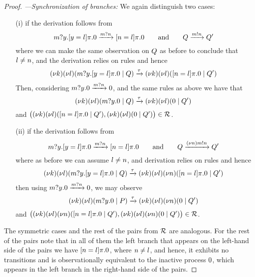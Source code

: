 \begin{proof}
\;\emph{---Synchronization of branches:}\;
We again distinguish two cases:
\begin{itemize}
\item [(i)] if the derivation follows from 
%
\[
m?y.[ y = l ]\pi.0\xrightarrow{m?n}[ n = l ]\pi.0 \qquad \mbox{and} \qquad 
Q\xrightarrow{m!n}Q'
\]
%
where we can make the same observation on $Q$ as before to conclude that $l\not=n$, 
and the derivation relies on rules  and  hence
%
\[
(\nu k) (\nu l)(m?y.[ y = l ]\pi.0 \;|\; Q)
\xrightarrow{\tau}
(\nu k) (\nu l)([ n = l ]\pi.0 \;|\; Q')
\]
%
Then, considering $m?y.0\xrightarrow{m?n}0$,
and the same rules as above we have that
%
\[
(\nu k) (\nu l)(m?y.0 \;|\; Q)
\xrightarrow{\tau}
(\nu k) (\nu l)(0 \;|\; Q')
\]
%
and $\big( (\nu k) (\nu l)([ n = l ]\pi.0 \;|\; Q'),
(\nu k) (\nu l)(0 \;|\; Q')\big)\in{\cal R}$.
\item [(ii)] 
if the derivation follows from 
%
\[
m?y.[ y = l ]\pi.0\xrightarrow{m?n}[ n = l ]\pi.0 \qquad \mbox{and} \qquad 
Q\xrightarrow{(\nu n)m!n}Q'
\]
%
where %
as before we can assume $l\not=n$,  
and derivation relies on rules  and  hence
%
\[
(\nu k) (\nu l)(m?y.[ y = l ]\pi.0 \;|\; Q)
\xrightarrow{\tau}
(\nu k) (\nu l)(\nu n)([ n = l ]\pi.0 \;|\; Q')
\]
%
then using $m?y.0\xrightarrow{m?n}0$,
we may observe
%
\[
(\nu k) (\nu l)(m?y.0 \;|\; P)
\xrightarrow{\tau}
(\nu k) (\nu l)(\nu n)(0 \;|\; Q')
\]
%
and $\big( (\nu k) (\nu l)(\nu n)([ n = l ]\pi.0 \;|\; Q'),
(\nu k) (\nu l)(\nu n)(0 \;|\; Q')\big)\in{\cal R}$.
\end{itemize}

The symmetric cases and the rest of the pairs from $\cal R$ are analogous. 
For the rest of the pairs note that in all of them the left branch that appears on the left-hand side of the pairs we have 
$[ n = l ]\pi.0$, where $n\not=l$, and hence, it exhibits no transitions and is observationally equivalent to the inactive process $0$, which appears in the left branch in the right-hand side of the pairs.



\end{proof}
